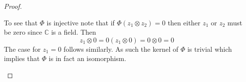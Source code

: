 \documentclass[10pt]{article}
\newcommand{\bb}[1]{\mathbb{#1}}
\theoremstyle{plain}
\theoremstyle{remark}
\begin{document}
\begin{proof}
\begin{enumerate}
    To see that $\Phi$ is injective note that if $\Phi(z_1\otimes z_2)=0$ then either
    $z_1$ or $z_2$ must be zero since $\bb{C}$ is a field. Then
    \[
      z_1\otimes 0 = 0(z_1\otimes 0)= 0\otimes 0 = 0
    \]
    The case for $z_1=0$ follows similarly. As such the kernel of $\Phi$ is trivial
    which implies that $\Phi$ is in fact an isomorphism.
  \end{enumerate}
\end{proof}

\end{document}
